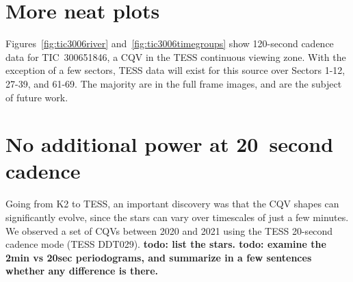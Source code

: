 \documentclass[11pt,twocolumn,tighten]{aastex63}
\begin{document}
\section{More neat plots}

Figures~\ref{fig:tic3006river} and~\ref{fig:tic3006timegroups} show 120-second
cadence data for TIC~300651846, a CQV in the TESS continuous viewing zone.
With the exception of a few sectors, TESS data will exist for this source
over Sectors 1-12, 27-39, and 61-69.
The majority are in the full frame images, and are the subject of future work.

\begin{figure*}[!t]
	\begin{center}
	\end{center}
	\vspace{-0.4cm}
	\caption{
		{\bf River plots of TIC 300651846}.
		The envelope has not been subtracted.
		7 sectors of continuous 2-minute observations S32-S39.  (Thanks to DDT029)
		Then a few in S60+ on the right.
		Compare to Figure~\ref{fig:cqvs}.
	}
	\label{fig:tic3006river}
\end{figure*}

\begin{figure*}[!t]
	\begin{center}
	\end{center}
	\vspace{-0.4cm}
	\caption{
		{\bf Orbit-phased plots of TIC 300651846}.
		The envelope has not been subtracted.
	}
	\label{fig:tic3006timegroups}
\end{figure*}



\section{No additional power at 20~second cadence}

Going from K2 to TESS, an important discovery was that the CQV shapes
can significantly evolve, since the stars can vary over timescales of just a few minutes.
We observed a set of CQVs between 2020 and 2021 using the TESS 20-second
cadence mode (TESS DDT029).
{\bf todo: list the stars.  todo: examine the 2min vs 20sec periodograms, and summarize in a few
sentences whether any difference is there.}
\end{document}
